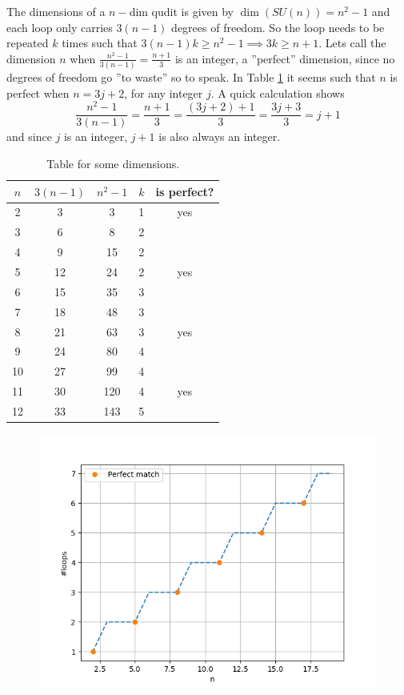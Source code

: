 The dimensions of a $n-$dim qudit is given by $\dim(SU(n)) = n^2 -1$ and each loop only carries $3(n-1)$ degrees of freedom. So the loop needs to be repeated $k$ times such that $3(n-1)k \geq n^2 -1 \implies 3k \geq n + 1$.
Lets call the dimension $n$ when $\frac{n^2-1}{3(n-1)} = \frac{n+1}{3}$ is an integer, a ''perfect'' dimension, since no degrees of freedom go ''to waste'' so to speak. In Table \ref{tab:dim} it seems such that $n$ is perfect when $n = 3j + 2$, for any integer $j$.
A quick calculation shows
\begin{equation}
\frac{n^2 -1}{3(n-1)} = \frac{n + 1}{3} = \frac{(3j+2) + 1}{3} = \frac{3j+3}{3} = j + 1 
\end{equation}
and since $j$ is an integer, $j + 1$ is also always an integer.\\
\begin{table}[H]
\centering 
\begin{tabular}{|c|c|c|c|c|}
\hline
$n$ & $3(n-1)$ & $n^2 - 1$ & $k$ & is perfect?\\
\hline
2& 3& 3& 1& yes\\
3& 6& 8& 2& \\
4& 9& 15& 2& \\
5& 12& 24& 2& yes \\
6& 15& 35& 3& \\
7& 18& 48& 3& \\
8& 21& 63& 3& yes \\
9& 24& 80& 4& \\
10& 27& 99& 4& \\
11& 30& 120& 4& yes \\
12& 33& 143& 5& \\
\hline
\end{tabular}
\caption{Table for some dimensions.}
\label{tab:dim}
\end{table}

\begin{figure}[H]
\centering
\includegraphics[scale=0.6]{figures/perfect_dim.png}
\end{figure}

